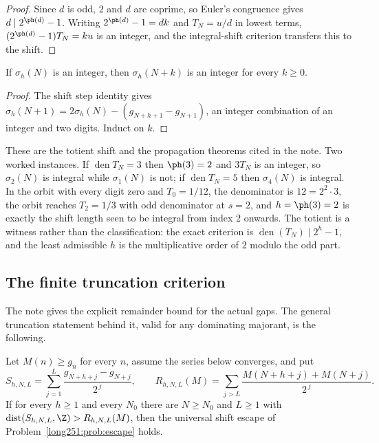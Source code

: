 \documentclass[11pt]{article}
\begin{document}
\begin{proof}
Since $d$ is odd, $2$ and $d$ are coprime, so Euler's congruence gives
$d\mid2^{\ph(d)}-1$.  Writing $2^{\ph(d)}-1=dk$ and $T_N=u/d$ in lowest terms,
$(2^{\ph(d)}-1)T_N=ku$ is an integer, and the integral-shift criterion
transfers this to the shift.
\end{proof}

\begin{proposition}[propagation]\label{long251:xr:propagate}
If $\sigma_h(N)$ is an integer, then $\sigma_h(N+k)$ is an integer for every
$k\ge0$.
\end{proposition}

\begin{proof}
The shift step identity gives
$\sigma_h(N+1)=2\sigma_h(N)-(g_{N+h+1}-g_{N+1})$, an integer combination of an
integer and two digits.  Induct on $k$.
\end{proof}

\noindent These are the totient shift and the propagation theorems cited in the
note.  Two worked instances.  If $\operatorname{den}T_N=3$ then $\ph(3)=2$ and
$3T_N$ is an integer, so $\sigma_2(N)$ is integral while $\sigma_1(N)$ is not;
if $\operatorname{den}T_N=5$ then $\sigma_4(N)$ is integral.  In the orbit with
every digit zero and $T_0=1/12$, the denominator is $12=2^2\cdot3$, the orbit
reaches $T_2=1/3$ with odd denominator at $s=2$, and $h=\ph(3)=2$ is exactly the
shift length seen to be integral from index $2$ onwards.  The totient is a
witness rather than the classification: the exact criterion is
$\operatorname{den}(T_N)\mid2^{h}-1$, and the least admissible $h$ is the
multiplicative order of $2$ modulo the odd part.

\subsection{The finite truncation criterion}\label{long251:sec:xr-truncation}

The note gives the explicit remainder bound for the actual gaps.  The general
truncation statement behind it, valid for any dominating majorant, is the
following.

\begin{proposition}\label{long251:xr:truncation}
Let $M(n)\ge g_n$ for every $n$, assume the series below converges, and put
\[
 S_{h,N,L}=\sum_{j=1}^{L}\frac{g_{N+h+j}-g_{N+j}}{2^{\,j}},\qquad
 R_{h,N,L}(M)=\sum_{j>L}\frac{M(N+h+j)+M(N+j)}{2^{\,j}} .
\]
If for every $h\ge1$ and every $N_0$ there are $N\ge N_0$ and $L\ge1$ with
$\operatorname{dist}(S_{h,N,L},\Z)>R_{h,N,L}(M)$, then the universal shift
escape of Problem~\ref{long251:prob:escape} holds.
\end{proposition}
\end{document}
